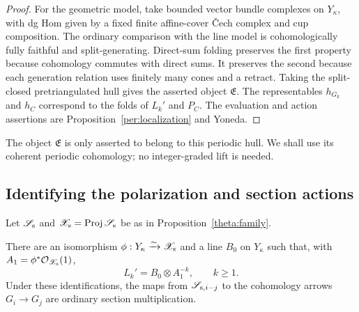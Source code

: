 \begin{proof}
For the geometric model, take bounded vector bundle complexes on
$Y_\kappa$, with dg Hom given by a fixed finite affine-cover \v Cech
complex and cup composition.  The ordinary comparison with the line
model is cohomologically fully faithful and split-generating.
Direct-sum folding preserves the first property because cohomology
commutes with direct sums.  It preserves the second because each
generation relation uses finitely many cones and a retract.  Taking
the split-closed pretriangulated hull gives the asserted object
$\mathfrak E$.  The representables $h_{G_k}$ and $h_C$ correspond to
the folds of $L_k'$ and $P_C$.  The evaluation and action assertions
are Proposition~\ref{per:localization} and Yoneda.
\end{proof}

The object $\mathfrak E$ is only asserted to belong to this periodic
hull.  We shall use its coherent periodic cohomology; no
integer-graded lift is needed.

\subsection{Identifying the polarization and section actions}

Let $\mathscr S_{\rm s}$ and
$\mathscr X_{\rm s}=\operatorname{Proj}\mathscr S_{\rm s}$ be as in
Proposition~\ref{theta:family}.

\begin{lemma}
\label{per:section-ring}
There are an isomorphism
$\phi:Y_\kappa\xrightarrow{\sim}\mathscr X_{\rm s}$ and a line
$B_0$ on $Y_\kappa$ such that, with
$A_1=\phi^*\mathcal O_{\mathscr X_{\rm s}}(1)$,
\begin{equation}
 L_k'=B_0\otimes A_1^{-k},\qquad k\ge1.
 \label{per:line-progression}
\end{equation}
Under these identifications, the maps from
$\mathscr S_{{\rm s},i-j}$ to the cohomology arrows $G_i\to G_j$
are ordinary section multiplication.
\end{lemma}


